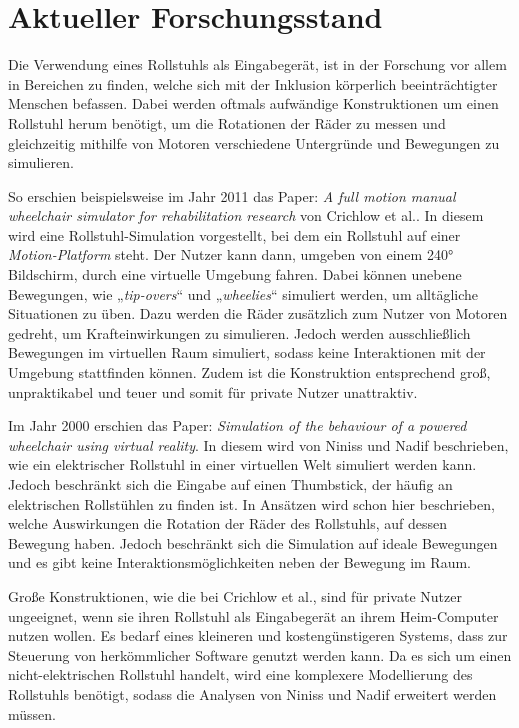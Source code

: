 \chapter{Aktueller Forschungsstand}
Die Verwendung eines Rollstuhls als Eingabegerät, ist in der Forschung vor allem in Bereichen zu finden, welche sich mit der Inklusion körperlich beeinträchtigter Menschen befassen\cite{buxbaumAssessmentSpatialAttention2008}.
Dabei werden oftmals aufwändige Konstruktionen um einen Rollstuhl herum benötigt, um die Rotationen der Räder zu messen und gleichzeitig mithilfe von Motoren verschiedene Untergründe und Bewegungen zu simulieren.

So erschien beispielsweise im Jahr 2011 das Paper: \textit{A full motion manual\\wheelchair simulator for rehabilitation research} von Crichlow et al.\cite{crichlowFullMotionManual2011}.
In diesem wird eine Rollstuhl-Simulation vorgestellt, bei dem ein Rollstuhl auf einer \textit{Motion-Platform} steht.
Der Nutzer kann dann, umgeben von einem 240° Bildschirm, durch eine virtuelle Umgebung fahren.
Dabei können unebene Bewegungen, wie „\textit{tip-overs}“ und „\textit{wheelies}“ simuliert werden, um alltägliche Situationen zu üben\cite{crichlowFullMotionManual2011}.
Dazu werden die Räder zusätzlich zum Nutzer von Motoren gedreht, um Krafteinwirkungen zu simulieren.
Jedoch werden ausschließlich Bewegungen im virtuellen Raum simuliert, sodass keine Interaktionen mit der Umgebung stattfinden können.
Zudem ist die Konstruktion entsprechend groß, unpraktikabel und teuer und somit für private Nutzer unattraktiv.

Im Jahr 2000 erschien das Paper: \textit{Simulation of the behaviour of a powered wheelchair using virtual reality}\cite{ninissSimulationBehaviourPowered2000}.
In diesem wird von Niniss und Nadif beschrieben, wie ein elektrischer Rollstuhl in einer virtuellen Welt simuliert werden kann.
Jedoch beschränkt sich die Eingabe auf einen Thumbstick, der häufig an elektrischen Rollstühlen zu finden ist.
In Ansätzen wird schon hier beschrieben, welche Auswirkungen die Rotation der Räder des Rollstuhls, auf dessen Bewegung haben.
Jedoch beschränkt sich die Simulation auf ideale Bewegungen und es gibt keine Interaktionsmöglichkeiten neben der Bewegung im Raum.

Große Konstruktionen, wie die bei Crichlow et al., sind für private Nutzer ungeeignet, wenn sie ihren Rollstuhl als Eingabegerät an ihrem Heim-Computer nutzen wollen.
Es bedarf eines kleineren und kostengünstigeren Systems, dass zur Steuerung von herkömmlicher Software genutzt werden kann.
Da es sich um einen nicht-elektrischen Rollstuhl handelt, wird eine komplexere Modellierung des Rollstuhls benötigt, sodass die Analysen von Niniss und Nadif erweitert werden müssen.